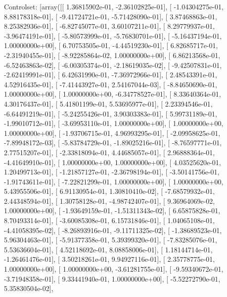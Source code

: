 \documentclass{article}
\begin{document}
Controlset: [array([[  1.36815902e-01,  -2.36102825e-01],
       [ -1.04304275e-01,   8.88178318e-01],
       [ -9.41724721e-01,  -5.71428090e-01],
       [  3.87468863e-01,   8.25382936e-01],
       [ -6.82745077e-01,   3.60107211e-01],
       [  8.29779937e-01,  -3.96474191e-01],
       [ -5.80573999e-01,  -5.76830701e-01],
       [ -5.16437194e-01,   1.00000000e+00],
       [  6.70753505e-01,  -4.44519230e-01],
       [  6.82685717e-01,  -2.31940455e-01],
       [ -8.92285864e-02,   1.00000000e+00],
       [  6.86213568e-01,  -6.52463863e-02],
       [ -6.00305374e-01,  -2.18619035e-02],
       [ -9.42507831e-01,  -2.62419991e-01],
       [  6.42631990e-01,  -7.36972966e-01],
       [  2.48543391e-01,   4.52916435e-01],
       [ -7.41443927e-01,   2.54167044e-03],
       [ -8.84650690e-01,   1.00000000e+00],
       [  1.00000000e+00,  -6.34778527e-01],
       [  8.33640364e-01,   4.30176437e-01],
       [  5.41801199e-01,   5.53695977e-01],
       [  2.23394546e-01,  -6.64491219e-01],
       [ -5.24255426e-01,   3.90303383e-01],
       [  5.99731189e-01,  -1.99010712e-01],
       [ -3.69953110e-01,   1.00000000e+00],
       [  1.00000000e+00,   1.00000000e+00],
       [ -1.93706715e-01,   4.96993295e-01],
       [ -2.09958625e-01,  -7.89948172e-03],
       [ -5.83784729e-01,  -1.89025216e-01],
       [ -8.76597771e-01,   2.77515207e-01],
       [ -2.33818094e-01,   4.44685057e-01],
       [  2.96888364e-01,  -4.41649910e-01],
       [  1.00000000e+00,   1.00000000e+00],
       [  4.03525620e-01,   1.20499713e-01],
       [ -1.21857127e-01,  -2.36798194e-01],
       [ -3.50141756e-01,  -1.91743611e-01],
       [ -7.22821299e-01,   1.00000000e+00],
       [  1.00000000e+00,   5.43955506e-01],
       [  6.91130954e-01,   1.30810410e-02],
       [ -7.68579932e-01,   2.44348594e-01],
       [  1.30758128e-01,  -4.98742407e-01],
       [  9.36964069e-02,   1.00000000e+00],
       [ -1.93649159e-01,  -1.51311343e-02],
       [  6.65875828e-01,   8.70493314e-01],
       [ -3.60085308e-01,   6.15731846e-01],
       [  1.04065108e-01,  -4.41058395e-02],
       [ -8.26893916e-01,  -9.11711325e-02],
       [ -1.38689523e-01,   5.96304463e-01],
       [ -5.91377358e-01,   5.39399320e-01],
       [ -7.83285076e-01,   5.53636604e-01],
       [  4.52118692e-01,   8.08858006e-01],
       [  1.18144714e-01,  -1.26461476e-01],
       [  3.50218261e-01,   9.94927116e-01],
       [  2.35778775e-01,   1.00000000e+00],
       [  1.00000000e+00,  -3.61281755e-01],
       [ -9.59340672e-01,  -3.71948358e-01],
       [  9.33441940e-01,   1.00000000e+00],
       [ -5.52272790e-01,   5.35830504e-02],
\end{document}
